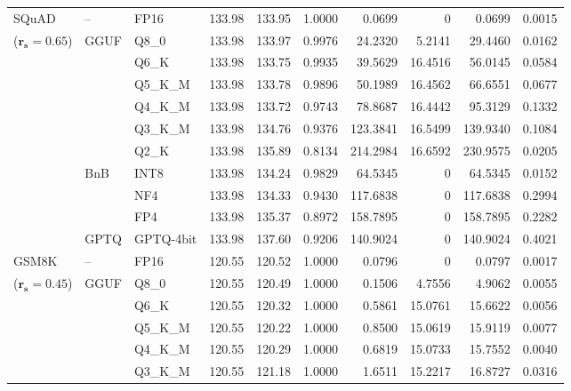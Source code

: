 \begin{longtable}{ll l rrrrrrr}
\midrule
SQuAD & -- & FP16 & 133.98 & 133.95 & 1.0000 & 0.0699 & \cellcolor{cyan!12} $0$ & 0.0699 & 0.0015 \\
{\small ($\mathbf{r_s{=}0.65}$)} & GGUF & Q8\_0 & 133.98 & 133.97 & 0.9976 & 24.2320 & 5.2141 & 29.4460 & 0.0162 \\
 &  & Q6\_K & 133.98 & 133.75 & 0.9935 & 39.5629 & 16.4516 & 56.0145 & 0.0584 \\
 &  & Q5\_K\_M & 133.98 & 133.78 & 0.9896 & 50.1989 & 16.4562 & 66.6551 & 0.0677 \\
 &  & Q4\_K\_M & 133.98 & 133.72 & 0.9743 & 78.8687 & 16.4442 & 95.3129 & 0.1332 \\
 &  & Q3\_K\_M & 133.98 & 134.76 & \cellcolor{red!18} 0.9376 & \cellcolor{red!18} 123.3841 & 16.5499 & \cellcolor{red!18} 139.9340 & \cellcolor{red!18} 0.1084 \\
 &  & Q2\_K & 133.98 & 135.89 & \cellcolor{red!18} 0.8134 & \cellcolor{red!18} 214.2984 & 16.6592 & \cellcolor{red!18} 230.9575 & \cellcolor{red!18} 0.0205 \\
 & BnB & INT8 & 133.98 & 134.24 & 0.9829 & 64.5345 & \cellcolor{cyan!12} $0$ & 64.5345 & 0.0152 \\
 &  & NF4 & 133.98 & 134.33 & \cellcolor{red!18} 0.9430 & \cellcolor{red!18} 117.6838 & \cellcolor{cyan!12} $0$ & \cellcolor{red!18} 117.6838 & \cellcolor{red!18} 0.2994 \\
 &  & FP4 & 133.98 & 135.37 & \cellcolor{red!18} 0.8972 & \cellcolor{red!18} 158.7895 & \cellcolor{cyan!12} $0$ & \cellcolor{red!18} 158.7895 & \cellcolor{red!18} 0.2282 \\
 & GPTQ & GPTQ-4bit & 133.98 & 137.60 & \cellcolor{red!18} 0.9206 & \cellcolor{red!18} 140.9024 & \cellcolor{cyan!12} $0$ & \cellcolor{red!18} 140.9024 & \cellcolor{red!18} 0.4021 \\
\midrule
GSM8K & -- & FP16 & 120.55 & 120.52 & 1.0000 & 0.0796 & \cellcolor{cyan!12} $0$ & 0.0797 & 0.0017 \\
{\small ($\mathbf{r_s{=}0.45}$)} & GGUF & Q8\_0 & 120.55 & 120.49 & 1.0000 & 0.1506 & 4.7556 & 4.9062 & 0.0055 \\
 &  & Q6\_K & 120.55 & 120.32 & 1.0000 & 0.5861 & 15.0761 & 15.6622 & 0.0056 \\
 &  & Q5\_K\_M & 120.55 & 120.22 & 1.0000 & 0.8500 & 15.0619 & 15.9119 & 0.0077 \\
 &  & Q4\_K\_M & 120.55 & 120.29 & 1.0000 & 0.6819 & 15.0733 & 15.7552 & 0.0040 \\
 &  & Q3\_K\_M & 120.55 & 121.18 & 1.0000 & 1.6511 & 15.2217 & 16.8727 & 0.0316 \\

\end{longtable}
